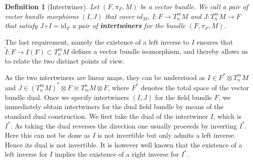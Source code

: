 \documentclass[a4paper,12pt, DIV=14, BCOR=5mm, twoside, headsepline, numbers=noenddot]{scrbook}
\newtheorem{definition}{Definition}[section]
\newtheorem*{remark}{Remark}
\begin{document}
\begin{definition}[Intertwiner]\label{interDef}
Let $(F,\pi_F,M)$ be a vector bundle. We call a pair of vector bundle morphisms $(I, J)$ that cover $id_M$,
$I: F \rightarrow T^m_n M$ and $J: T^m_n M \rightarrow F $ that satisfy  $J \circ I = \mathrm{id}_F$ a pair of \textbf{\textit{intertwiners}} for the bundle $(F, \pi_F, M)$.
\end{definition}
The last requirement, namely the existence of a left inverse to $I$ ensures that $\tilde{I} : F \rightarrow I(F) \subset T^m_nM$ defines a vector bundle isomorphism, and thereby allows us to relate the two distinct points of view.

As the two intertwiners are linear maps, they can be understood as $I \in F^{\ast} \otimes T^m_n M$ and $J \in (T^m_nM)^{\ast} \otimes F \cong T^n_m M \otimes F$, where $F^{\ast}$ denotes the total space of the vector bundle dual. 
Once we specify intertwiners $(I,J)$ for the field bundle $F$, we immediately obtain intertwiners for the dual field bundle by means of the standard dual construction. We first take the dual of the intertwiner $I$, which is $I^{\ast}$. As taking the dual reverses the direction one usually proceeds by inverting $I^{\ast}$. Here this can not be done as $I$ is not invertible but only admits a left inverse. Hence its dual is not invertible. It is however well known that the existence of a left inverse for $I$ implies the existence of a right inverse for $I^{\ast}$. 
\end{document}
